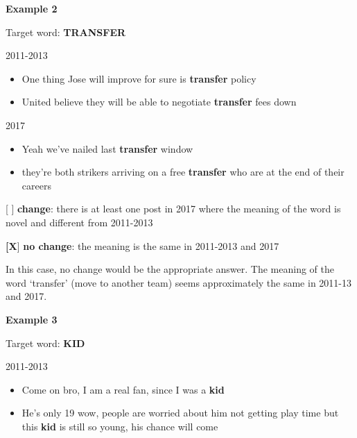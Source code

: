 \documentclass[11pt,a4paper]{article}
\begin{document}
\begin{minipage}{15cm}

\textbf{Example 2}

\vspace*{0.5cm}

Target word: \textbf{TRANSFER}

\vspace*{0.25cm}
2011-2013
\begin{itemize}
\item One thing Jose will improve for sure is \textbf{transfer} policy
\item United believe they will be able to negotiate \textbf{transfer} fees down
\end{itemize}

\vspace*{0.25cm}

2017
\begin{itemize}
\item Yeah we've nailed last \textbf{transfer} window
\item they're both strikers arriving on a free \textbf{transfer} who are at the end of their careers
\end{itemize}

\vspace*{0.25cm}

[  ] \textbf{change}: there is at least one post in 2017 where the meaning of the word is novel and different from 2011-2013

\textbf{[X}]  \textbf{no change}: the meaning is the same in 2011-2013 and 2017

\vspace*{0.25cm}

In this case, no change would be the appropriate answer. The meaning of the word `transfer' (move to another team) seems approximately the same in 2011-13 and 2017.

\vspace*{1.5cm}

\textbf{Example 3}

\vspace*{0.5cm}

Target word: \textbf{KID}

\vspace*{0.25cm}
2011-2013
\begin{itemize}
\item Come on bro, I am a real fan, since I was a \textbf{kid}
\item He's only 19 wow, people are worried about him not getting play time but this \textbf{kid} is still so young, his chance will come
\end{itemize}


\end{minipage}
\end{document}
